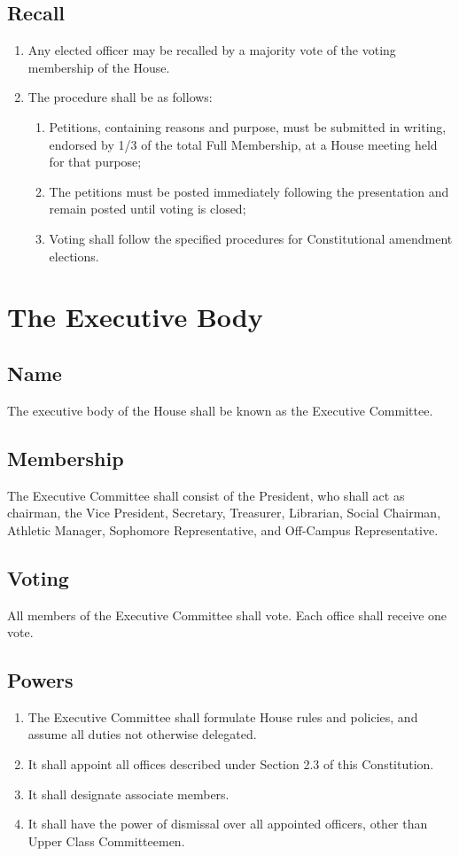 \documentclass[10pt]{article} %
\begin{document}
\subsection{Recall}
\begin{enumerate}
\item Any elected officer may be recalled by a majority vote of the voting membership of the House. 
\item The procedure shall be as follows:
\begin{enumerate}
\item Petitions, containing reasons and purpose, must be submitted in writing, endorsed by 1/3 of the total Full Membership, at a House meeting held for that purpose;
\item The petitions must be posted immediately following the presentation and remain posted until voting is closed;
\item Voting shall follow the specified procedures for Constitutional amendment elections.
\end{enumerate}
\end{enumerate}
\section{The Executive Body}
\subsection{Name}
The executive body of the House shall be known as the Executive Committee.
\subsection{Membership}
The Executive Committee shall consist of the President, who shall act as chairman, the Vice President, Secretary, Treasurer, Librarian, Social Chairman, Athletic Manager, Sophomore Representative, and Off-Campus Representative.
\subsection{Voting}
All members of the Executive Committee shall vote. Each office shall receive one vote.
\subsection{Powers}
\begin{enumerate}
\item The Executive Committee shall formulate House rules and policies, and assume all duties not otherwise delegated.
\item It shall appoint all offices described under Section 2.3 of this Constitution.
\item It shall designate associate members.
\item It shall have the power of dismissal over all appointed officers, other than Upper Class Committeemen.
\end{enumerate}
\end{document}
